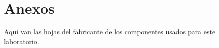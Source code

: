  \section{Anexos}
 Aquí van las hojas del fabricante de los componentes usados para este laboratorio. 


%  
%  
%  
%